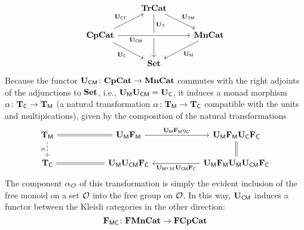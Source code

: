 \documentclass[11pt,oneside,article]{memoir}
\begin{document}
\begin{equation}\label{eqn:tetrahedron}
   \begin{tikzcd}
      & \TrCat \ar[dr,"\UTM"] \ar[dd,"\UT" near start] & \\
      \CompCat \ar[rr,crossing over,"\UCM"' near start] \ar[dr,"\UC"'] \ar[ru,"\UCT"]
         && \MonCat \ar[dl,"\UM"] \\
      & \Set &
   \end{tikzcd}
\end{equation}
Because the functor $\mathbf{U}_{\mathsf{CM}}\colon\mathbf{CpCat}\to\mathbf{MnCat}$ commutes with the right adjoints of the
adjunctions to $\mathbf{Set}$, i.e., $\mathbf{U}_{\mathsf{M}}\mathbf{U}_{\mathsf{CM}}=\mathbf{U}_{\mathsf{C}}$, it induces a monad morphism $\alpha\colon\mathbf{T}_{\mathsf{C}}\to\mathbf{T}_{\mathsf{M}}$ (a natural transformation
$\alpha\colon\mathbf{T}_{\mathsf{M}}\to\mathbf{T}_{\mathsf{C}}$ compatible with the units and multipications), given by the composition of
the natural transformations
\begin{equation*}
	\begin{tikzcd}[column sep=2cm]
		\TM\ar[r,equal]\ar[d,dashed,"\alpha"']&\UM\FM\ar[r,"\UM\FM\eta_C"]&\UM\FM\UC\FC\ar[d,equal]\\
		\TC&\UM\UCM\FC\ar[l,equal]&\UM\FM\UM\UCM\FC\ar[l,"\UM\epsilon_M\UCM\FC"]
	\end{tikzcd}
\end{equation*}
The component $\alpha_{\mathcal{O}}$ of this transformation is simply the evident inclusion of the free monoid on a set
$\mathcal{O}$ into the free group on $\mathcal{O}$. In this way, $\mathbf{U}_{\mathsf{CM}}$ induces a functor between the Kleisli categories in the other direction:
\begin{equation}\label{eqn:FMC}
   \mathbf{F}_{\mathsf{MC}}\colon\mathbf{FMnCat}\to\mathbf{FCpCat}
\end{equation}

%
\end{document}
